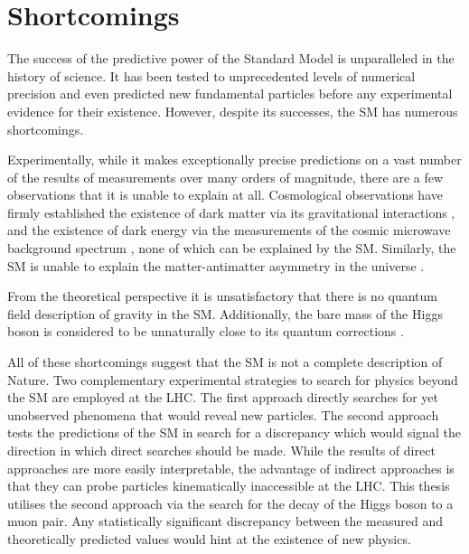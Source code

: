 \section{Shortcomings}

The success
of the predictive power of the Standard Model is unparalleled in the history of science.
It has been tested to unprecedented levels of numerical precision and even predicted new
fundamental particles before any experimental evidence for their existence. However,
despite its successes, the SM has numerous shortcomings.

Experimentally, while it makes exceptionally
precise predictions on a vast number of the results of measurements over many orders
of magnitude, there are a few observations that it is unable to explain at all.
Cosmological observations have firmly established the existence of dark matter via its
gravitational interactions \cite{Zwicky2008, rotation, Ade:2015, Clowe:2006}, and the existence of dark energy via the measurements of
the cosmic microwave background spectrum \cite{Ade:2015}, none of which can be explained by the SM.
Similarly, the SM is unable to explain the matter-antimatter asymmetry in the universe \cite{sarkar2007particle}.

From the theoretical perspective it is unsatisfactory that there is no quantum field description of gravity
in the SM. Additionally, the bare mass of the Higgs boson is considered to be
unnaturally close to its quantum corrections \cite{Schwartz:2013pla}.

All of these shortcomings suggest that the SM is not a complete description of Nature.
Two complementary experimental strategies to search for physics beyond the SM are
employed at the LHC. The first approach directly searches
for yet unobserved phenomena that would reveal new particles. The second approach tests
the predictions of the SM in search for a discrepancy which would signal the direction
in which direct searches should be made. While the results of direct approaches are
more easily interpretable, the advantage of indirect approaches is that they can probe
particles kinematically inaccessible at the LHC. This thesis utilises the second
approach via the search for the decay of the Higgs boson to a muon pair. Any
statistically significant discrepancy between the measured and theoretically predicted
values would hint at the existence of new physics.

